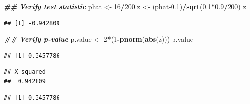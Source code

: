 \documentclass[
]{book}
\newenvironment{Shaded}{\begin{snugshade}}{\end{snugshade}}
\newcommand{\DecValTok}[1]{\textcolor[rgb]{0.00,0.00,0.81}{#1}}
\newcommand{\DocumentationTok}[1]{\textcolor[rgb]{0.56,0.35,0.01}{\textbf{\textit{#1}}}}
\newcommand{\FloatTok}[1]{\textcolor[rgb]{0.00,0.00,0.81}{#1}}
\newcommand{\FunctionTok}[1]{\textcolor[rgb]{0.13,0.29,0.53}{\textbf{#1}}}
\newcommand{\NormalTok}[1]{#1}
\newcommand{\OtherTok}[1]{\textcolor[rgb]{0.56,0.35,0.01}{#1}}
\newcommand{\SpecialCharTok}[1]{\textcolor[rgb]{0.81,0.36,0.00}{\textbf{#1}}}
\theoremstyle{definition}
\theoremstyle{definition}
\theoremstyle{definition}
\theoremstyle{definition}
\theoremstyle{remark}
\begin{document}
\begin{Shaded}
\begin{Highlighting}[]
\DocumentationTok{\#\# Verify test statistic}
\NormalTok{phat }\OtherTok{\textless{}{-}} \DecValTok{16}\SpecialCharTok{/}\DecValTok{200}
\NormalTok{z }\OtherTok{\textless{}{-}}\NormalTok{ (phat}\FloatTok{{-}0.1}\NormalTok{)}\SpecialCharTok{/}\FunctionTok{sqrt}\NormalTok{(}\FloatTok{0.1}\SpecialCharTok{*}\FloatTok{0.9}\SpecialCharTok{/}\DecValTok{200}\NormalTok{)}
\NormalTok{z}
\end{Highlighting}
\end{Shaded}

\begin{verbatim}
## [1] -0.942809
\end{verbatim}

\begin{Shaded}
\begin{Highlighting}[]
\DocumentationTok{\#\# Verify p{-}value}
\NormalTok{p.value }\OtherTok{\textless{}{-}} \DecValTok{2}\SpecialCharTok{*}\NormalTok{(}\DecValTok{1}\SpecialCharTok{{-}}\FunctionTok{pnorm}\NormalTok{(}\FunctionTok{abs}\NormalTok{(z)))}
\NormalTok{p.value}
\end{Highlighting}
\end{Shaded}

\begin{verbatim}
## [1] 0.3457786
\end{verbatim}

\begin{Shaded}
\end{Shaded}

\begin{verbatim}
## X-squared 
##  0.942809
\end{verbatim}

\begin{Shaded}
\end{Shaded}

\begin{verbatim}
## [1] 0.3457786
\end{verbatim}
\end{document}

